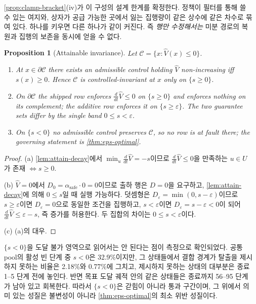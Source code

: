 \documentclass[11pt]{article}
\theoremstyle{plain}
\newtheorem{proposition}[theorem]{Proposition}
\theoremstyle{definition}
\theoremstyle{remark}
\newcommand{\calC}{\mathcal{C}}
\newcommand{\Vhat}{\widehat V}
\begin{document}
\noindent
\cref{prop:clamp-bracket}(iv)가 이 구성의 설계 한계를 확정한다. 정책이 필터를 통해
쓸 수 있는 여지와, 상자가 공급 가능한 곳에서 잃는 집행량이 같은 상수에 같은 차수로
묶여 있다. 하나를 키우면 다른 하나가 같이 커진다. 즉 \emph{행만 수정해서는} 미분
경로의 복원과 집행의 보존을 동시에 얻을 수 없다.

\begin{proposition}[Attainable invariance]\label{prop:attain-inv}
Let $\calC = \{x : \Vhat(x) \le 0\}$.
\begin{enumerate}
\item[(a)] At $x \in \partial\calC$ there exists an admissible control holding
$\Vhat$ non-increasing iff $s(x) \ge 0$. Hence $\calC$ is controlled-invariant
at $x$ only on $\{s \ge 0\}$.
\item[(b)] On $\partial\calC$ the shipped row enforces
$\tfrac{d}{dt}\Vhat \le 0$ on $\{s \ge 0\}$ and enforces nothing on its complement;
the additive row enforces it on $\{s \ge \varepsilon\}$. The two guarantee sets differ
by the single band $0 \le s < \varepsilon$.
\item[(c)] On $\{s < 0\}$ no admissible control preserves $\calC$, so no row is
at fault there; the governing statement is \cref{thm:eps-optimal}.
\end{enumerate}
\end{proposition}
\begin{proof}
(a) \cref{lem:attain-decay}에서 $\min_u \frac{d}{dt}\Vhat = -s$이므로
$\frac{d}{dt}\Vhat \le 0$을 만족하는 $u \in U$가 존재 $\iff s \ge 0$.

(b) $\Vhat = 0$에서 $D_0 = \alpha_{\text{safe}} \cdot 0 = 0$이므로 출하 행은
$D = 0$을 요구하고, \cref{lem:attain-decay}에 의해 $0 \le s$일 때 실행 가능하다.
덧셈형은 $D_\varepsilon = \min(0, s-\varepsilon)$이므로 $s \ge \varepsilon$이면
$D_\varepsilon = 0$으로 동일한 조건을 집행하고, $s < \varepsilon$이면
$D_\varepsilon = s - \varepsilon < 0$이 되어 $\frac{d}{dt}\Vhat \le \varepsilon - s$,
즉 증가를 허용한다. 두 집합의 차이는 $0 \le s < \varepsilon$이다.

(c) (a)의 대우.
\end{proof}

\noindent
$\{s<0\}$을 도달 불가 영역으로 읽어서는 안 된다는 점이 측정으로 확인되었다.
공통 pool의 활성 빈 단계 중 $s<0$은 32.9\%이지만, 그 상태들에서 결합 경계가
탈출을 제시하지 못하는 비율은 2.18\%와 0.77\%에 그치고, 제시하지 못하는 상태의
대부분은 종료 1--5 단계 전에 놓인다. 반면 목표 도달 궤적 안의 같은 상태들은 종료까지
56--95 단계가 남아 있고 회복한다. 따라서 $\{s<0\}$은 갇힘이 아니라 통과 구간이며,
그 위에서 의미 있는 성질은 불변성이 아니라 \cref{thm:eps-optimal}의 최소 위반
성질이다.
\end{document}

